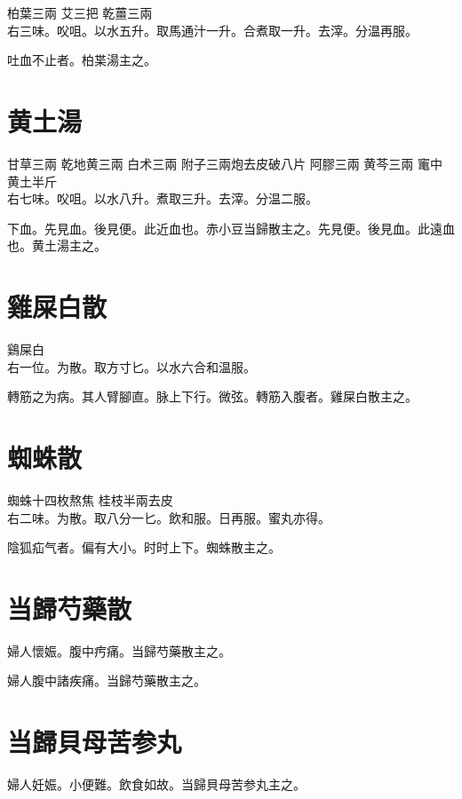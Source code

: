 柏葉{\scriptsize 三兩} 艾{\scriptsize 三把} 乾薑{\scriptsize 三兩}\\
右三味。㕮咀。以水五升。取馬通汁一升。合煮取一升。去滓。分温再服。

吐血不止者。柏枼湯主之。

\section{黄土湯}

甘草{\scriptsize 三兩} 乾地黄{\scriptsize 三兩} 白术{\scriptsize 三兩} 附子{\scriptsize 三兩炮去皮破八片} 阿膠{\scriptsize 三兩} 黄芩{\scriptsize 三兩} 竃中黄土{\scriptsize 半斤}\\
右七味。㕮咀。以水八升。煮取三升。去滓。分温二服。

下血。先見血。後見便。此近血也。赤小豆当歸散主之。先見便。後見血。此遠血也。黄土湯主之。

\section{雞屎白散}

鷄屎白\\
右一位。为散。取方寸匕。以水六合和温服。

轉筋之为病。其人臂腳直。脉上下行。微弦。轉筋入腹者。雞屎白散主之。

\section{蜘蛛散}

蜘蛛{\scriptsize 十四枚熬焦} 桂枝{\scriptsize 半兩去皮}\\
右二味。为散。取八分一匕。飲和服。日再服。蜜丸亦得。

陰狐疝气者。偏有大小。时时上下。蜘蛛散主之。

\section{当歸芍藥散}

婦人懷娠。腹中㽲痛。当歸芍藥散主之。

婦人腹中諸疾痛。当歸芍藥散主之。

\section{当歸貝母苦参丸}

{\khaaitp 婦人}妊娠。小便難。飲食如故。{\khaaitp 当}歸{\khaaitp 貝}母苦参丸主之。


